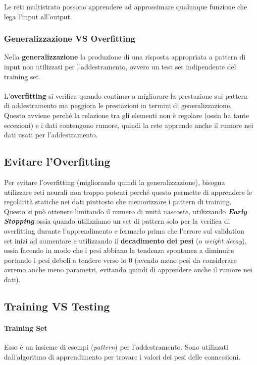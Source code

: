 \documentclass[12pt, a4paper]{article}
\begin{document}
Le reti multistrato possono apprendere ad approssimare qualunque funzione che lega l'input all'output.\\

\subsubsection{Generalizzazione VS Overfitting}
Nella \textbf{generalizzazione} la produzione di una risposta appropriata a pattern di input non utilizzati per l'addestramento, ovvero un test set indipendente del training set.
\\\\
L'\textbf{overfitting} si verifica quando continua a migliorare la prestazione sui pattern di addestramento ma peggiora le prestazioni in termini di generalizzazione.\\
Questo avviene perché la relazione tra gli elementi non è regolare (ossia ha tante eccezioni) e i dati contengono rumore, quindi la rete apprende anche il rumore nei dati usati per l'addestramento.

\subsection{Evitare l'Overfitting}
Per evitare l'overfitting (migliorando quindi la generalizzazione), bisogna utilizzare reti neurali non troppo potenti perché questo permette di apprendere le regolarità statiche nei dati piuttosto che memorizzare i pattern di training. Questo si può ottenere limitando il numero di unità nascoste,
utilizzando \textbf{\textit{Early Stopping}} ossia quando utilizziamo un set di pattern solo per la verifica di overfitting durante l'apprendimento e fermarlo prima che l'errore sul validation set inizi ad aumentare e utilizzando il \textbf{decadimento dei pesi} (o \textit{weight decay}), ossia facendo in modo che i pesi abbiano la tendenza spontanea a diminuire portando i pesi deboli a tendere verso lo 0 (avendo meno pesi da considerare avremo anche meno parametri, evitando quindi di apprendere anche il rumore nei dati).

\subsection{Training VS Testing}
\paragraph{Training Set}
Esso è un insieme di esempi (\textit{pattern}) per l'addestramento. Sono utilizzati dall'algoritmo di apprendimento per trovare i valori dei pesi delle connessioni.
\end{document}
